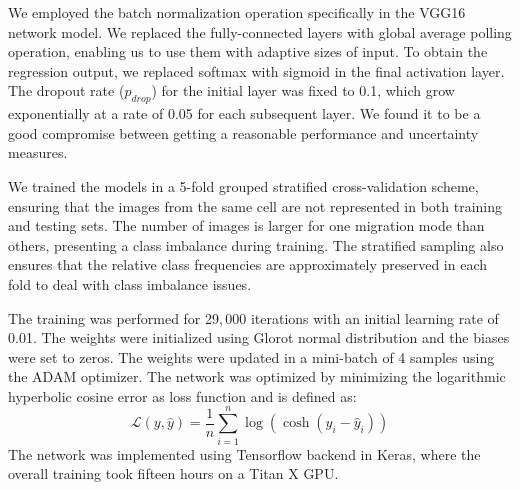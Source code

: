 \documentclass{article}
\begin{document}
We employed the batch normalization operation specifically in the VGG16 
network model. 
We replaced the fully-connected layers with global average polling operation,
enabling us to use them with adaptive sizes of input. 
To obtain the regression output, we replaced softmax with sigmoid in the final
activation layer. 
The dropout rate ($p_{drop}$) for the initial layer was fixed to 0.1, which grow
exponentially at a rate of 0.05 for each subsequent layer. 
We found it to be a good compromise between getting a reasonable performance
and uncertainty measures.

We trained the models in a 5-fold grouped stratified cross-validation scheme,
ensuring that the images from the same cell are not represented in both training
and testing sets. 
The number of images is larger for one migration mode than others, presenting
a class imbalance during training. 
The stratified sampling also ensures that the relative class frequencies are 
approximately preserved in each fold to deal with class imbalance issues.

The training was performed for 29,\,000 iterations with an initial learning rate of 0.01.
The weights were initialized using Glorot normal distribution \cite{glorot2010understanding} 
and the biases were set to zeros.
The weights were updated in a mini-batch of 4 samples using the ADAM optimizer.
The network was optimized by minimizing the logarithmic hyperbolic cosine error as loss function
and is defined as:
\begin{equation}
    {\mathcal{L}}(y,{\hat{y}})=\frac{1}{n}\sum_{i=1}^{n}\log(\cosh(y_{i}-{\hat{y}_{i}}))
\end{equation}
The network was implemented using Tensorflow backend in Keras, where the overall training took 
fifteen hours on a Titan X GPU.




\end{document}
